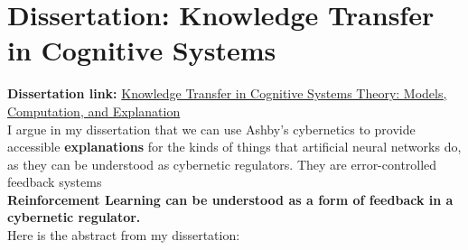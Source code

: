 \documentclass[11pt, oneside]{article}   	%
\begin{document}











\section{Dissertation: Knowledge Transfer in Cognitive Systems}

\noindent \textbf{Dissertation link:} \href{https://edoc.ub.uni-muenchen.de/28655/}{Knowledge Transfer in Cognitive Systems Theory: Models, Computation, and Explanation} \\

\noindent I argue in my dissertation that we can use Ashby's cybernetics to provide accessible \textbf{explanations} for the kinds of things that artificial neural networks do, as they can be understood as cybernetic regulators.  They are error-controlled feedback systems  \\

\noindent \textbf{Reinforcement Learning can be understood as a form of feedback in a cybernetic regulator.} \\


\noindent Here is the abstract from my dissertation:\\
\end{document}
